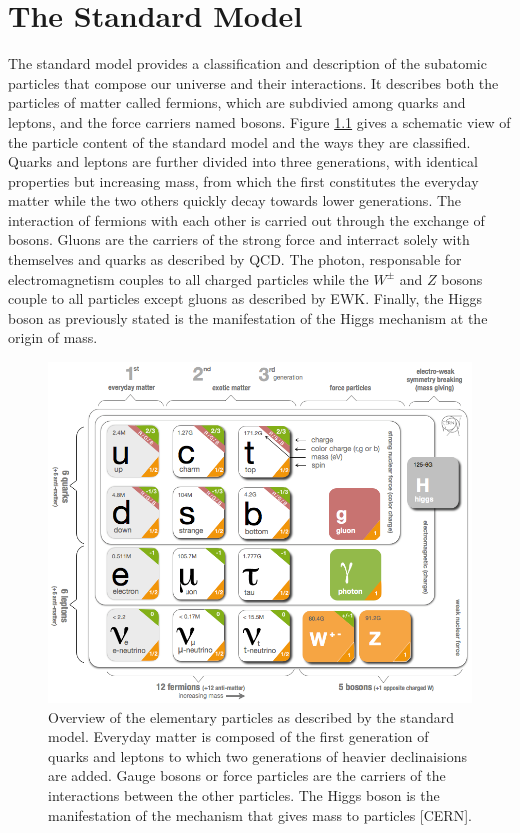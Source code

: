 \chapter{The Standard Model}
\label{chap:I-1-standard-model}

  The standard model provides a classification and description of the subatomic particles that compose our universe and their interactions. It describes both the particles of matter called fermions, which are subdivied among quarks and leptons, and the force carriers named bosons. Figure \ref{fig:I-1-sm-particles} gives a schematic view of the particle content of the standard model and the ways they are classified. Quarks and leptons are further divided into three generations, with identical properties but increasing mass, from which the first constitutes the everyday matter while the two others quickly decay towards lower generations. The interaction of fermions with each other is carried out through the exchange of bosons. Gluons are the carriers of the strong force and interract solely with themselves and quarks as described by QCD. The photon, responsable for electromagnetism couples to all charged particles while the $ W^\pm $ and $ Z $ bosons couple to all particles except gluons as described by EWK. Finally, the Higgs boson as previously stated is the manifestation of the Higgs mechanism at the origin of mass. \\

	\begin{figure}[h!]
		\centering
		\includegraphics[width = 0.8 \textwidth]{img/I-1/sm-particles.png}
		\caption{Overview of the elementary particles as described by the standard model. Everyday matter is composed of the first generation of quarks and leptons to which two generations of heavier declinaisions are added. Gauge bosons or force particles are the carriers of the interactions between the other particles. The Higgs boson is the manifestation of the mechanism that gives mass to particles [CERN].}
		\label{fig:I-1-sm-particles}
	\end{figure}

